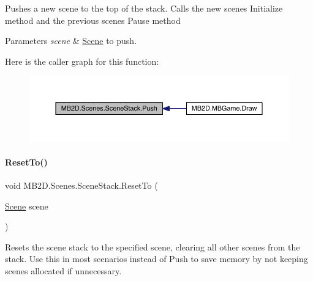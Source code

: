 Pushes a new scene to the top of the stack. Calls the new scenes Initialize method and the previous scenes Pause method 


\begin{DoxyParams}{Parameters}
{\em scene} & \hyperlink{class_m_b2_d_1_1_scenes_1_1_scene}{Scene} to push.\\
\hline
\end{DoxyParams}
Here is the caller graph for this function\+:
\nopagebreak
\begin{figure}[H]
\begin{center}
\leavevmode
\includegraphics[width=350pt]{class_m_b2_d_1_1_scenes_1_1_scene_stack_a22760622453ac16621534bc324ec039f_icgraph}
\end{center}
\end{figure}
\hypertarget{class_m_b2_d_1_1_scenes_1_1_scene_stack_a521a38426d3e85caeb53b2909b623562}{}\label{class_m_b2_d_1_1_scenes_1_1_scene_stack_a521a38426d3e85caeb53b2909b623562} 
\paragraph{\texorpdfstring{Reset\+To()}{ResetTo()}}
{\footnotesize\ttfamily void M\+B2\+D.\+Scenes.\+Scene\+Stack.\+Reset\+To (\begin{DoxyParamCaption}\item[{\hyperlink{class_m_b2_d_1_1_scenes_1_1_scene}{Scene}}]{scene }\end{DoxyParamCaption})\hspace{0.3cm}{\ttfamily [inline]}}



Resets the scene stack to the specified scene, clearing all other scenes from the stack. Use this in most scenarios instead of Push to save memory by not keeping scenes allocated if unnecessary. 


